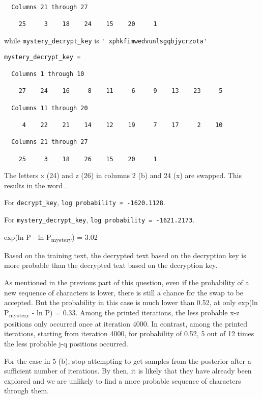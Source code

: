 \documentclass[a4paper,12pt]{exam}
\begin{document}
\begin{questions}
\begin{parts}
\begin{verbatim}
  Columns 21 through 27

    25     3    18    24    15    20     1

\end{verbatim}

while \verb|mystery_decrypt_key| is \verb|' xphkfimwedvunlsgqbjycrzota'|

\begin{verbatim}
mystery_decrypt_key =

  Columns 1 through 10

    27    24    16     8    11     6     9    13    23     5

  Columns 11 through 20

     4    22    21    14    12    19     7    17     2    10

  Columns 21 through 27

    25     3    18    26    15    20     1

\end{verbatim}

The letters x (24) and z (26) in columns 2 (b) and 24 (x) are swapped. This results in the word .

For \verb|decrypt_key|, \verb|log probability = -1620.1128|.

For \verb|mystery_decrypt_key|, \verb|log probability = -1621.2173|.

exp(ln P - ln P\textsubscript{mystery}) = 3.02

Based on the training text, the decrypted text based on the  decryption key is more probable than the decrypted text based on the  decryption key. 

As mentioned in the previous part of this question, even if the probability of a new sequence of characters is lower, there is still a chance for the swap to be accepted. But the probability in this case is much lower than 0.52, at only exp(ln P\textsubscript{mystery} - ln P) = 0.33. Among the printed iterations, the less probable x-z positions only occurred once at iteration 4000. In contrast, among the printed iterations, starting from iteration 4000, for probability of 0.52, 5 out of 12 times the less probable j-q positions occurred.
\end{parts}

\question
For the case in 5 (b), stop attempting to get samples from the posterior after a sufficient number of iterations. By then, it is likely that they have already been explored and we are unlikely to find a more probable sequence of characters through them.


\end{questions}
\end{document}
